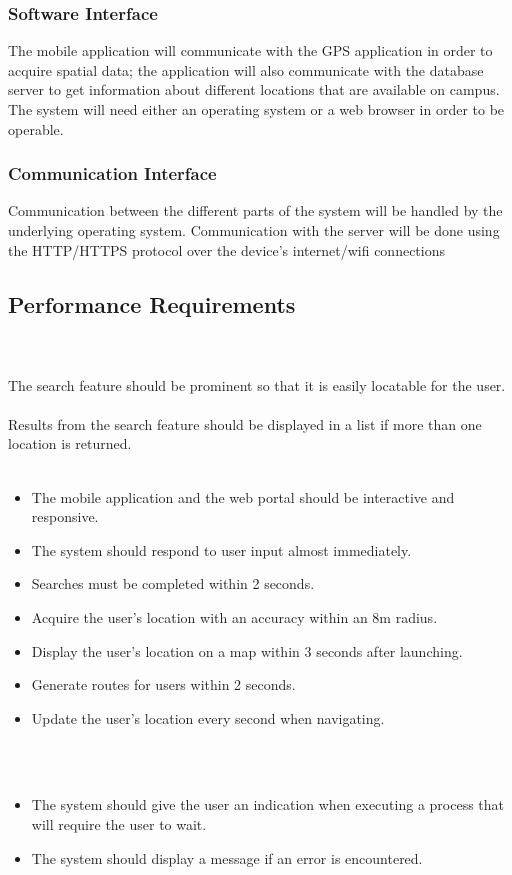     \subsubsection{Software Interface}
    The mobile application will communicate with the GPS application in order to acquire spatial data; the application will also communicate with the database server to get information about different locations that are available on campus. The system will need either an operating system or a web browser in order to be operable.
        
    \subsubsection{Communication Interface}
    Communication between the different parts of the system will be handled by the underlying operating system. Communication with the server will be done using the HTTP/HTTPS protocol over the device's internet/wifi connections

\subsection{Performance Requirements}
    \\ \\
        The search feature should be prominent so that it is easily locatable for the user.
    \\ \\    
        Results from the search feature should be displayed in a list if more than one location is returned.
    \\ \\
        \begin{itemize}
            \item The mobile application and the web portal should be interactive and responsive.
            \item The system should respond to user input almost immediately.
            \item Searches must be completed within 2 seconds.
            \item Acquire the user's location with an accuracy within an 8m radius.
			\item Display the user's location on a map within 3 seconds after launching.
			\item Generate routes for users within 2 seconds.
			\item Update the user's location every second when navigating.
        \end{itemize}
    \\ \\
        \begin{itemize}
            \item The system should give the user an indication when executing a process that will require the user to wait.
            \item The system should display a message if an error is encountered.
        \end{itemize}
